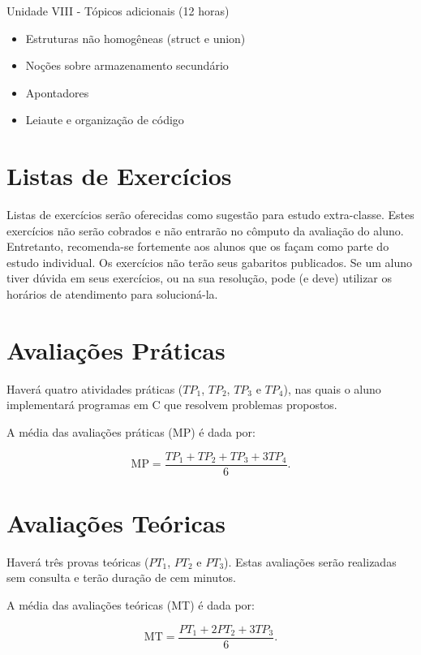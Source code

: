 \documentclass[12pt]{article}
\begin{document}
\noindent
Unidade VIII - T\'opicos adicionais (12 horas)
\begin{itemize}
\item Estruturas n\~ao homog\^eneas (struct e union)
\item No\c{c}\~oes sobre armazenamento secund\'ario
\item Apontadores
\item Leiaute e organiza\c{c}\~ao de c\'odigo
\end{itemize}

\section{Listas de Exerc\'icios}
Listas de exerc\'icios ser\~ao oferecidas como sugest\~ao para estudo {extra-classe}. Estes exer\-c\'i\-cios n\~ao ser\~ao cobrados e n\~ao entrar\~ao no c\^omputo da avalia\c{c}\~ao do aluno. Entretanto, recomenda-se fortemente aos alunos que
os fa\c{c}am como parte do estudo individual. Os exerc\'icios n\~ao ter\~ao seus gabaritos publicados. Se um aluno tiver d\'uvida em seus exerc\'icios, ou na sua resolu\c{c}\~ao, pode (e deve) utilizar os hor\'arios de atendimento para solucion\'a-la.

\section{Avalia\c{c}\~oes Pr\'aticas}
Haver\'a quatro atividades pr\'aticas ($TP_1$, $TP_2$, $TP_3$ e $TP_4$), nas quais o aluno implementar\'a programas em C que resolvem  problemas propostos.  

A m\'edia das avalia\c{c}\~oes pr\'aticas (MP) \'e dada por:

\begin{equation}
\mathrm{MP} = \frac{TP_1 + TP_2 + TP_3 + 3TP_4}{6}.
\end{equation}

\section{Avalia\c{c}\~oes Te\'oricas}
Haver\'a três provas te\'oricas ($PT_1$, $PT_2$ e $PT_3$). Estas avalia\c{c}\~oes ser\~ao realizadas sem consulta e ter\~ao dura\c{c}\~ao de cem minutos.  

A m\'edia das avalia\c{c}\~oes te\'oricas (MT) \'e dada por:

\begin{equation}
\mathrm{MT} = \frac{PT_1 + 2PT_2 + 3TP_3}{6}.
\end{equation}
\end{document}
